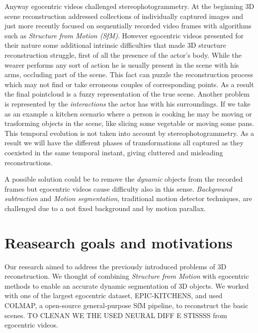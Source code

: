 Anyway egocentric videos challenged stereophotogrammetry.
At the beginning 3D scene reconstruction addressed collections of individually captured images and just more recently focused
on sequentially recorded video frames with algorithms such as \textit{Structure from Motion (SfM)}. However egocentric videos presented for their nature some 
additional intrinsic difficulties that made 3D structure reconstruction struggle, first of all the presence of the actor's body.
While the wearer performs any sort of action he is usually present in the scene with his arms, occluding part of the scene. This fact 
can puzzle the reconstruction process which may not find or take erroneous couples of corresponding points. As a result the 
final pointcloud is a fuzzy representation of the true scene.
Another problem is represented by the \textit{interactions} the actor has with his surroundings. If we take as an example a kitchen 
scenario where a person is cooking he may be moving or trasforming objects in the scene, like slicing some vegetable or moving some pans. This temporal evolution
is not taken into account by stereophotogrammetry. As a result we will have the different phases of transformations all captured as they coexisted
in the same temporal instant, giving cluttered and misleading reconstructions.

A possible solution could be to remove the \textit{dynamic} objects from the recorded frames but egocentric videos cause difficulty also in this sense.
\textit{Background subtraction} and \textit{Motion segmentation}, traditional motion detector techniques, are challenged due to a not fixed background and 
by motion parallax.

\section*{Reasearch goals and motivations}
Our research aimed to address the previously introduced problems of 3D reconstruction. We thought of combining \textit{Structure from Motion} with egocentric
methods to enable an accurate dynamic segmentation of 3D objects. We worked with one of the largest egocentric dataset, EPIC-KITCHENS, and used COLMAP,
 a open-source general-purpose SfM pipeline, to reconstruct the basic scenes. TO CLENAN WE THE USED NEURAL DIFF E STISSSS
from egocentric videos.


\begin{comment}
Photogrammetry has its origins way before Egocentric vision, anyway with first-person videos it found  fertile
ground to expand his objectives. 
\end{comment}